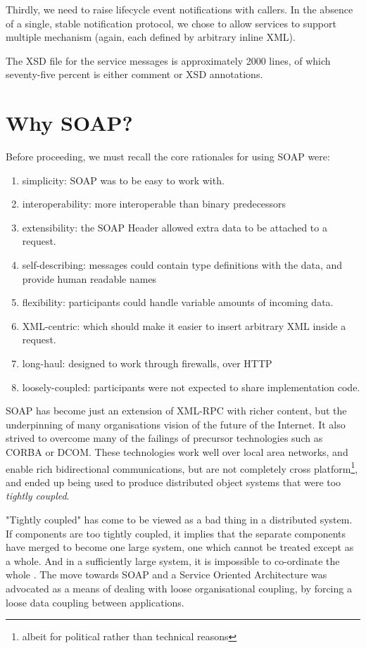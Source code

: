 \documentclass[draft]{article}
\begin{document}
Thirdly, we need to raise lifecycle event notifications with callers. In the absence
of a single, stable notification protocol, we chose to allow services to support multiple
mechanism (again, each defined by arbitrary inline XML).

The XSD file for the service messages is approximately 2000 lines, of which  seventy-five percent
is either comment or XSD annotations. 

\section{Why SOAP?}

Before proceeding, we must recall the core rationales for using SOAP 
were:
\begin{enumerate}
\item simplicity: SOAP was to be easy to work with.
\item interoperability: more interoperable than binary predecessors
\item extensibility: the SOAP Header allowed extra data to be attached to a
request. 
\item self-describing: messages could contain type definitions with the
data, and provide human readable names
\item flexibility: participants could handle variable amounts of
incoming data.
\item XML-centric: which should make it easier to insert arbitrary XML
inside a request.
\item long-haul: designed to work through firewalls, over HTTP
\item loosely-coupled: participants were not expected to share
implementation code.
\end{enumerate}

SOAP has become just an extension of XML-RPC
\cite{spec:XML-RPC} with richer content, but the underpinning of many
organisations vision of the future of the Internet. It also strived to
overcome many of the failings of precursor technologies such as CORBA or
DCOM. These technologies work well over local area networks, and enable
rich bidirectional communications, but are not completely cross
platform\footnote{albeit for political rather than technical reasons},
and ended up being used to produce distributed object systems that were
too \emph{tightly coupled}.

"Tightly coupled" has come to be viewed as a bad thing in a distributed
system. If components are too tightly coupled, it implies that the
separate components have merged to become one large system, one which
cannot be treated except as a whole. And in a sufficiently large system,
it is impossible to co-ordinate the whole \cite{deutsch, jini}. The move
towards SOAP and a Service Oriented Architecture was advocated as a
means of dealing with loose organisational coupling, by forcing a loose
data coupling between applications. 
\end{document}
